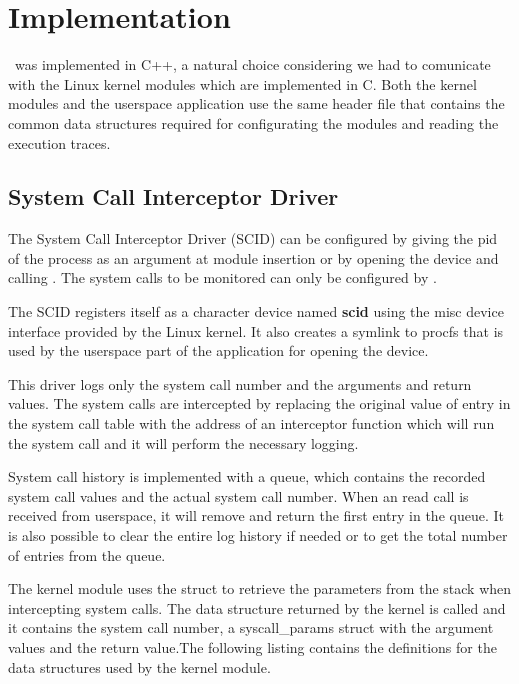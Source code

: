 \chapter{Implementation}
\label{chapter:fourth}

\project\ was implemented in C++, a natural choice considering we had to comunicate with the Linux kernel modules which are implemented in C. Both the kernel modules and the userspace application use the same header file that contains the common data structures required for configurating the modules and reading the execution traces.

\section{System Call Interceptor Driver}
\label{fourth:scid}

The System Call Interceptor Driver (SCID) can be configured by giving the pid of the process as an argument at module insertion or by opening the device and calling . The system calls to be monitored can only be configured by .

The SCID registers itself as a character device named \textbf{scid} using the misc device interface provided by the Linux kernel. It also creates a symlink to procfs that is used by the userspace part of the application for opening the device.

This driver logs only the system call number and the arguments and return values. The system calls are intercepted by replacing the original value of entry in the system call table with the address of an interceptor function which will run the system call and it will perform the necessary logging.

System call history is implemented with a queue, which contains the recorded system call values and the actual system call number. When an  read call is received from userspace, it will remove and return the first entry in the queue. It is also possible to clear the entire log history if needed or to get the total number of entries from the queue.

The kernel module uses the  struct to retrieve the parameters from the stack when intercepting system calls. The data structure returned by the kernel is called  and it contains the system call number, a syscall_params struct with the argument values and the return value.The following listing contains the definitions for the data structures used by the kernel module.

